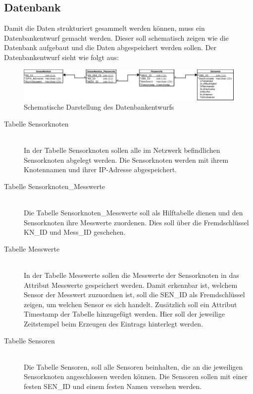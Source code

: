 \subsection{Datenbank}\label{sub:Datenbank}
Damit die Daten strukturiert gesammelt werden können, muss ein Datenbankentwurf gemacht werden. Dieser soll schematisch zeigen wie die Datenbank aufgebaut und die Daten abgespeichert werden sollen. Der Datenbankentwurf sieht wie folgt aus:
\begin{landscape}
	\begin{figure}[ht]
		\begin{center}
			\includegraphics[width=\paperwidth]{Bilder/Kapitel3/Datenbankentwurf.jpeg}
			\caption[Schematische Darstellung des Datenbankentwurfs]{Schematische Darstellung des Datenbankentwurfs}
			\label{fig:Datenbankentwurf}
		\end{center}
	\end{figure}
\end{landscape}
\begin{description}
	\item[Tabelle Sensorknoten] \hfill \\
		In der Tabelle Sensorknoten sollen alle im Netzwerk befindlichen Sensorknoten abgelegt werden. Die Sensorknoten werden mit ihrem Knotennamen und ihrer IP-Adresse abgespeichert.
	\item[Tabelle Sensorknoten\_Messwerte] \hfill \\
		Die Tabelle Sensorknoten\_Messwerte soll als Hilftabelle dienen und den Sensorknoten ihre Messwerte zuordenen. Dies soll über die Fremdschlüssel KN\_ID und Mess\_ID geschehen.
	\item[Tabelle Messwerte] \hfill \\
		In der Tabelle Messwerte sollen die Messwerte der Sensorknoten in das Attribut Messwerte gespeichert werden. Damit erkennbar ist, welchem Sensor der Messwert zuzuordnen ist, soll die SEN\_ID als Fremdschlüssel zeigen, um welchen Sensor es sich handelt. Zusätzlich soll ein Attribut Timestamp der Tabelle hinzugefügt werden. Hier soll der jeweilige Zeitstempel beim Erzeugen des Eintrags hinterlegt werden.
	\item[Tabelle Sensoren] \hfill \\	
		Die Tabelle Sensoren, soll alle Sensoren beinhalten, die an die jeweiligen Sensorknoten angeschlossen werden können. Die Sensoren sollen mit einer festen SEN\_ID und einem festen Namen versehen werden.
\end{description}


